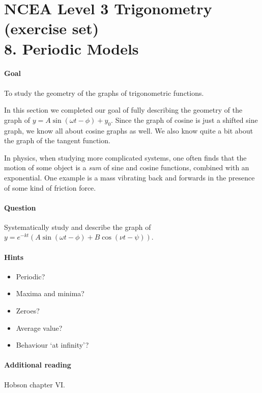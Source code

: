 \documentclass[answers]{exam}
\begin{document}
\section*{NCEA Level 3 Trigonometry (exercise set)\\8. Periodic Models}
\paragraph{Goal} To study the geometry of the graphs of trigonometric functions.

In this section we completed our goal of fully describing the geometry of the graph of $ y = A \sin(\omega t - \phi) + y_0 $. Since
the graph of cosine is just a shifted sine graph, we know all about cosine graphs as well. We also know quite a bit about the graph
of the tangent function.

In physics, when studying more complicated systems, one often finds that the motion of some object is a \emph{sum} of sine and cosine
functions, combined with an exponential. One example is a mass vibrating back and forwards in the presence of some kind of friction
force.

\paragraph{Question} Systematically study and describe the graph of $ y = e^{-kt} \left(A \sin(\omega t - \phi) + B \cos(\nu t - \psi)\right) $.

\paragraph{Hints}
\begin{itemize}
  \item Periodic?
  \item Maxima and minima?
  \item Zeroes?
  \item Average value?
  \item Behaviour `at infinity'?
\end{itemize}

\paragraph{Additional reading} Hobson chapter VI.
\end{document}
